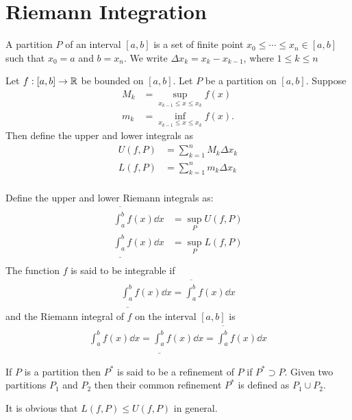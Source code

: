 \section{Riemann Integration}
\begin{definition}
  A partition $P$ of an interval $[a,b]$ is a set of finite point $x_0\leq \cdots \leq x_n \in [a,b]$ such that $x_0 =a$ and $b=x_n$. We write $\Delta x_k = x_{k} - x_{k-1}$, where $1\leq k\leq n$
\end{definition}
\begin{definition}
  Let $f:[a,b]\to \mathbb{R}$ be bounded on $[a,b]$. Let $P$ be a partition on $[a,b]$. Suppose
  \begin{align*}
    M_k &= \sup_{x_{k-1} \leq x \leq x_k} f(x)\\
    m_k &= \inf_{x_{k-1} \leq x \leq x_k} f(x).
  \end{align*}
  Then define the upper and lower integrals as
  \begin{align*}
    U(f,P) &= \sum_{k=1}^{n} M_k \Delta x_k\\
    L(f,P) &= \sum_{k=1}^{n} m_k \Delta x_k\\
  \end{align*}
\end{definition}
\begin{definition}
  Define the upper and lower Riemann integrals as:
  \begin{align*}
    \overline{\int^{b}_{a}} f(x) \dd x &= \sup_{P} U(f,P)\\
    \underline{\int^{b}_{a}} f(x) \dd x &= \sup_{P} L(f,P)\\
  \end{align*}
  The function $f$ is said to be integrable if
  \begin{align*}
    \underline{\int^{b}_{a}} f(x) \dd x = \overline{\int^{b}_{a}} f(x) \dd x
  \end{align*}
  and the Riemann integral of $f$ on the interval $[a,b]$ is
  \begin{align*}
    \int^b_a f(x) \dd x = \underline{\int^{b}_{a}} f(x) \dd x = \overline{\int^{b}_{a}} f(x) \dd x
  \end{align*}
\end{definition}
\begin{definition}
  If $P$ is a partition then $P^*$ is said to be a refinement of $P$ if $P^* \supset P$. Given two partitions $P_1$ and $P_2$ then their common refinement $P^*$ is defined as $P_1 \cup P_2$.
\end{definition}
\begin{remark}
  It is obvious that $L(f,P) \leq U(f,P)$ in general.
\end{remark}
